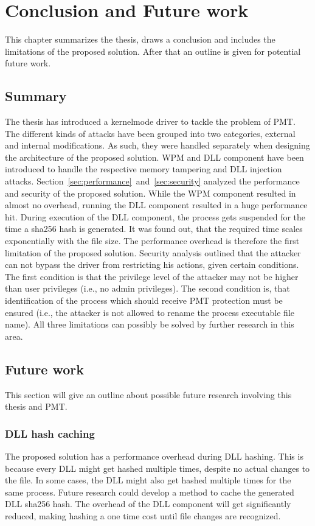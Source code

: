 \section{Conclusion and Future work}
\label{sec:futurework}
This chapter summarizes the thesis, draws a conclusion and includes the limitations of the proposed solution. After that an outline is given for potential future work.
\subsection{Summary}
The thesis has introduced a kernelmode driver to tackle the problem of \gls{PMT}. The different kinds of attacks have been grouped into two categories, external and internal modifications. As such, they were handled separately when designing the architecture of the proposed solution. \gls{WPM} and \gls{DLL} component have been introduced to handle the respective memory tampering and \gls{DLL} injection attacks. Section~\ref{sec:performance}~and~\ref{sec:security} analyzed the performance and security of the proposed solution. While the \gls{WPM} component resulted in almost no overhead, running the \gls{DLL} component resulted in a huge performance hit. During execution of the \gls{DLL} component, the process gets suspended for the time a sha256 hash is generated. It was found out, that the required time scales exponentially with the file size. The performance overhead is therefore the first limitation of the proposed solution. Security analysis outlined that the attacker can not bypass the driver from restricting his actions, given certain conditions. The first condition is that the privilege level of the attacker may not be higher than user privileges (i.e., no admin privileges). The second condition is, that identification of the process which should receive \gls{PMT} protection must be ensured (i.e., the attacker is not allowed to rename the process executable file name). All three limitations can possibly be solved by further research in this area.
\subsection{Future work}
This section will give an outline about possible future research involving this thesis and \gls{PMT}.
\subsubsection{DLL hash caching}
The proposed solution has a performance overhead during \gls{DLL} hashing. This is because every \gls{DLL} might get hashed multiple times, despite no actual changes to the file. In some cases, the \gls{DLL} might also get hashed multiple times for the same process. Future research could develop a method to cache the generated \gls{DLL} sha256 hash. The overhead of the \gls{DLL} component will get significantly reduced, making hashing a one time cost until file changes are recognized. 
